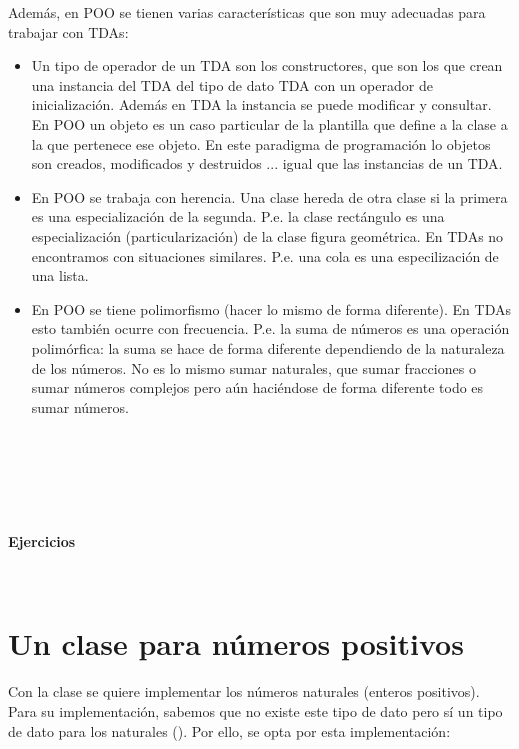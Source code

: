 \noindent Además, en POO se tienen varias características que son muy adecuadas para trabajar con TDAs:

\begin{itemize}
\item Un tipo de operador de un TDA son los constructores, que son los que crean una instancia del TDA del tipo de dato TDA con un operador de inicialización. Además en TDA la instancia se puede modificar y consultar. En POO un objeto es un caso particular de la plantilla que define a la clase a la que pertenece ese objeto. En este paradigma de programación lo objetos son creados, modificados y destruidos ... igual que las instancias de un TDA.

\item En POO se trabaja con herencia. Una clase hereda de otra clase si la primera es una especialización de la segunda. P.e. la clase rectángulo es una especialización (particularización) de la clase figura geométrica. En TDAs no encontramos con situaciones similares. P.e. una cola es una especilización de una lista.

\item En POO se tiene polimorfismo (hacer lo mismo de forma diferente). En TDAs esto también ocurre con frecuencia. P.e. la suma de números es una operación polimórfica: la suma se hace de forma diferente dependiendo de la naturaleza de los números. No es lo mismo sumar naturales, que sumar fracciones o sumar números complejos pero aún haciéndose de forma diferente todo es sumar números.
\end{itemize}






\


\

\

\centerline{\Large \bf Ejercicios}

\

\formatoEjercicio



\separacion
\section{Un clase para números positivos} \label{sec:numerosPositivos}

Con la clase  se quiere implementar los números
naturales (enteros positivos). 
Para su implementación, sabemos que no existe este tipo de dato pero sí un tipo de dato para los naturales (). Por ello, se opta por esta implementación:

